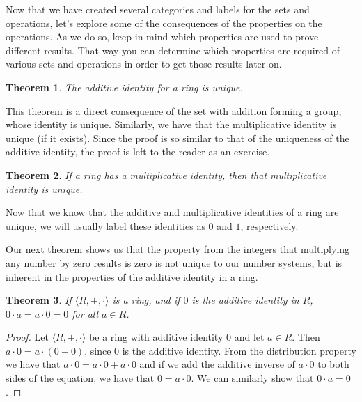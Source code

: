 \documentclass[
]{book}
\newtheorem{theorem}{Theorem}[chapter]
\theoremstyle{definition}
\theoremstyle{definition}
\theoremstyle{definition}
\theoremstyle{remark}
\begin{document}
Now that we have created several categories and labels for the sets and operations, let's explore some of the consequences of the properties on the operations. As we do so, keep in mind which properties are used to prove different results. That way you can determine which properties are required of various sets and operations in order to get those results later on.

\begin{theorem}
\protect\hypertarget{thm:unnamed-chunk-169}{}{\label{thm:unnamed-chunk-169} } The additive identity for a ring is unique.
\end{theorem}

This theorem is a direct consequence of the set with addition forming a group, whose identity is unique. Similarly, we have that the multiplicative identity is unique (if it exists). Since the proof is so similar to that of the uniqueness of the additive identity, the proof is left to the reader as an exercise.

\begin{theorem}
\protect\hypertarget{thm:multiplicative-identity}{}{\label{thm:multiplicative-identity} }If a ring has a multiplicative identity, then that multiplicative identity is unique.
\end{theorem}

Now that we know that the additive and multiplicative identities of a ring are unique, we will usually label these identities as \(0\) and \(1\), respectively.

Our next theorem shows us that the property from the integers that multiplying any number by zero results is zero is not unique to our number systems, but is inherent in the properties of the additive identity in a ring.

\begin{theorem}
\protect\hypertarget{thm:zero-multiplication}{}{\label{thm:zero-multiplication} }If \(\langle R,+,\cdot\rangle\) is a ring, and if \(0\) is the additive identity in \(R\), \(0\cdot a=a\cdot 0=0\) for all \(a\in R\).
\end{theorem}

\begin{proof}
{}Let \(\langle R,+,\cdot\rangle\) be a ring with additive identity \(0\) and let \(a\in R\). Then \(a \cdot 0 = a \cdot (0+0)\), since \(0\) is the additive identity. From the distribution property we have that \(a \cdot 0 = a \cdot 0 + a \cdot 0\) and if we add the additive inverse of \(a \cdot 0\) to both sides of the equation, we have that \(0=a\cdot 0\). We can similarly show that \(0\cdot a=0\).
\end{proof}
\end{document}
